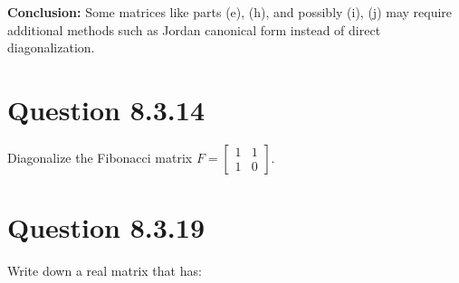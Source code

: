 \documentclass[12pt]{article}
\begin{document}
\textbf{Conclusion:} Some matrices like parts (e), (h), and possibly (i), (j) may require additional methods such as Jordan canonical form instead of direct diagonalization.


\newpage
\section*{Question 8.3.14}
Diagonalize the Fibonacci matrix \( F = \begin{bmatrix} 1 & 1 \\ 1 & 0 \end{bmatrix} \).

\section*{Question 8.3.19}
Write down a real matrix that has:
\end{document}
